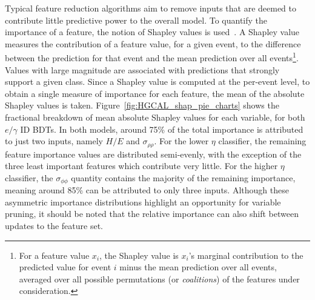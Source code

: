 Typical feature reduction algorithms aim to remove inputs that are deemed to contribute little predictive power to the overall model. To quantify the importance of a feature, the notion of Shapley values is used~\cite{SHAPTheory,SHAP}. A Shapley value measures the contribution of a feature value, for a given event, to the difference between the prediction for that event and the mean prediction over all events\footnote{For a feature value $x_{i}$, the Shapley value is $x_{i}$'s marginal contribution to the predicted value for event $i$ minus the mean prediction over all events, averaged over all possible permutations (or \textit{coalitions}) of the features under consideration.}. Values with large magnitude are associated with predictions that strongly support a given class. Since a Shapley value is computed at the per-event level, to obtain a single measure of importance for each feature, the mean of the absolute Shapley values is taken. Figure~\ref{fig:HGCAL_shap_pie_charts} shows the fractional breakdown of mean absolute Shapley values for each variable, for both $e/\gamma$ ID BDTs. In both models, around 75\% of the total importance is attributed to just two inputs, namely $H/E$ and $\sigma_{\rho\rho}$. For the lower $\eta$ classifier, the remaining feature importance values are distributed semi-evenly, with the exception of the three least important features which contribute very little. For the higher $\eta$ classifier, the $\sigma_{\phi\phi}$ quantity contains the majority of the remaining importance, meaning around 85\% can be attributed to only three inputs. Although these asymmetric importance distributions highlight an opportunity for variable pruning, it should be noted that the relative importance can also shift between updates to the feature set.

